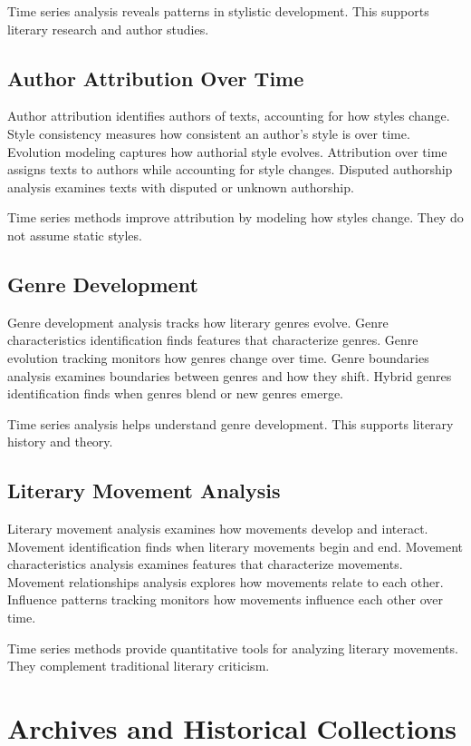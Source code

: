 Time series analysis reveals patterns in stylistic development. This supports literary research and author studies.

\subsection{Author Attribution Over Time}

Author attribution identifies authors of texts, accounting for how styles change. Style consistency measures how consistent an author's style is over time. Evolution modeling captures how authorial style evolves. Attribution over time assigns texts to authors while accounting for style changes. Disputed authorship analysis examines texts with disputed or unknown authorship.

Time series methods improve attribution by modeling how styles change. They do not assume static styles.

\subsection{Genre Development}

Genre development analysis tracks how literary genres evolve. Genre characteristics identification finds features that characterize genres. Genre evolution tracking monitors how genres change over time. Genre boundaries analysis examines boundaries between genres and how they shift. Hybrid genres identification finds when genres blend or new genres emerge.

Time series analysis helps understand genre development. This supports literary history and theory.

\subsection{Literary Movement Analysis}

Literary movement analysis examines how movements develop and interact. Movement identification finds when literary movements begin and end. Movement characteristics analysis examines features that characterize movements. Movement relationships analysis explores how movements relate to each other. Influence patterns tracking monitors how movements influence each other over time.

Time series methods provide quantitative tools for analyzing literary movements. They complement traditional literary criticism.

\section{Archives and Historical Collections}

